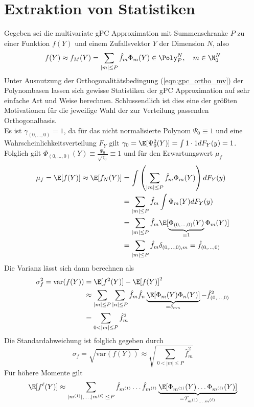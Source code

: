 \section{Extraktion von Statistiken}
Gegeben sei die multivariate gPC Approximation mit Summenschranke $P$ zu einer Funktion $f(Y)$ und einem Zufallsvektor $Y$ der Dimension $N$, also
\[f(Y)\approx f_M(Y)=\sum_{|m|\le P}\hat{f}_m\Phi_m(Y)\in\Poly_P^N,\quad m\in\N_0^N\]
Unter Ausnutzung der Orthogonalitätsbedingung (\ref{eqn:gpc_ortho_mv}) der Polynombasen lassen sich gewisse Statistiken der gPC Approximation auf sehr einfache Art und Weise berechnen. Schlussendlich ist dies eine der größten Motivationen für die jeweilige Wahl der zur Verteilung passenden Orthogonalbasis.\\
Es ist $\gamma_{(0,\dots,0)}=1$, da für das nicht normalisierte Polynom $\Psi_0\equiv 1$ und eine Wahrscheinlichkeitsverteilung $F_Y$ gilt $\gamma_0=\E[\Psi_0^2(Y)]=\int 1\cdot 1dF_Y(y)=1$. Folglich gilt $\Phi_{(0,\dots,0)}(Y)\equiv \frac{\Psi_0}{\sqrt{\gamma_0}}\equiv 1$ und für den Erwartungswert $\mu_f$
\begin{equation}
\label{eqn:gpc_approx_exp}
\begin{split}
\mu_f=\E[f(Y)]\approx \E[f_N(Y)]&=\int\left(\sum_{|m|\le P}\hat{f}_m\Phi_m(Y)\right)dF_Y(y)\\
&=\sum_{|m|\le P}\hat{f}_m\int\Phi_m(Y)dF_Y(y)\\
&=\sum_{|m|\le P}\hat{f}_m\E[\underbrace{\Phi_{(0,\dots,0)}(Y)}_{\equiv 1} \Phi_m(Y)]\\
&=\sum_{|m|\le P}\hat{f}_m\delta_{(0,\dots,0),m}=\hat{f}_{(0,\dots,0)}
\end{split}
\end{equation}
Die Varianz lässt sich dann berechnen als
\begin{align*}
\sigma^2_f=\text{var}(f(Y))&=\E[f^2(Y)]-\E[f(Y)]^2\\
&\approx \sum_{|m|\le P}\sum_{|n|\le P}\hat{f}_m\hat{f}_n\underbrace{\E[\Phi_m(Y)\Phi_n(Y)]}_{=\delta_{mn}}-\hat{f}_{(0,\dots,0)}^2\\
&=\sum_{0<|m|\le P}\hat{f}_m^2
\end{align*}
Die Standardabweichung ist folglich gegeben durch
\[\sigma_f=\sqrt{\text{var}(f(Y))}\approx\sqrt{\sum_{0<|m|\le P}\hat{f}_m^2}\]
Für höhere Momente gilt
\begin{align*}
\E[f^\ell(Y)]\approx \sum_{|m^{(1)}|,\dots,|m^{(\ell)}|\le P} \hat{f}_{m^{(1)}}\dots\hat{f}_{m^{(\ell)}}\underbrace{\E[\Phi_{m^{(1)}}(Y)\dots\Phi_{m^{(\ell)}}(Y)]}_{=\mathcal{T}_{m^{(1)},\dots m^{(\ell)}}}
\end{align*}

